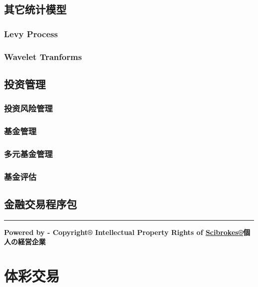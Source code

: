 \documentclass[]{book}
\begin{document}
\section{其它统计模型}

\subsection{Levy Process}\label{levy-process}

\subsection{Wavelet Tranforms}\label{wavelet-tranforms}

\section{投资管理}

\subsection{投资风险管理}

\subsection{基金管理}

\subsection{多元基金管理}

\subsection{基金评估}

\section{金融交易程序包}

\begin{center}\rule{0.5\linewidth}{\linethickness}\end{center}

\textbf{Powered by - Copyright® Intellectual Property Rights of
\href{http://www.scibrokes.com}{Scibrokes®}個人の経営企業}

\chapter{体彩交易}\label{sportsbook}
\end{document}
